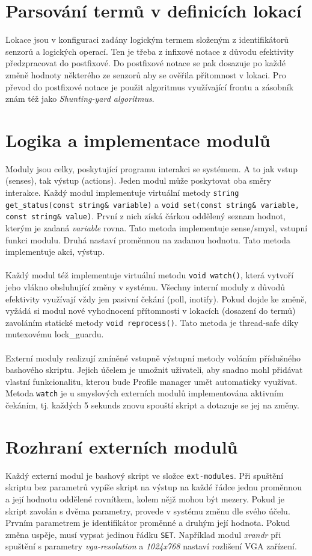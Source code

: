 \documentclass[10pt,a4paper]{article}
\begin{document}
\section*{Parsování termů v definicích lokací}
Lokace jsou v konfiguraci zadány logickým termem složeným z identifikátorů senzorů a logických operací. Ten je třeba z infixové notace z důvodu efektivity předzpracovat do postfixové. Do postfixové notace se pak dosazuje po každé změně hodnoty některého ze senzorů aby se ověřila přítomnost v lokaci. Pro převod do postfixové notace je použit algoritmus využívající frontu a zásobník znám též jako {\it Shunting-yard algoritmus}. \\

\section*{Logika a implementace modulů}
Moduly jsou celky, poskytující programu interakci se systémem. A to jak vstup (senses), tak výstup (actions). Jeden modul může poskytovat oba směry interakce. Každý modul implementuje virtuální metody \texttt{string get\_status(const string\& variable)} a \texttt{void set(const string\& variable, const string\& value)}. První z nich získá čárkou oddělený seznam hodnot, kterým je zadaná {\it variable} rovna. Tato metoda implementuje sense/smysl, vstupní funkci modulu. Druhá nastaví proměnnou na zadanou hodnotu. Tato metoda implementuje akci, výstup. \\
\\
Každý modul též implementuje virtuální metodu \texttt{void watch()}, která vytvoří jeho vlákno obsluhující změny v systému. Všechny interní moduly z důvodů efektivity využívají vždy jen pasivní čekání (poll, inotify). Pokud dojde ke změně, vyžádá si modul nové vyhodnocení přítomnosti v lokacích (dosazení do termů) zavoláním statické metody \texttt{void reprocess()}. Tato metoda je thread-safe díky mutexovému lock\_guardu. \\
\\
Externí moduly realizují zmíněné vstupně výstupní metody voláním příslušného bashového skriptu. Jejich účelem je umožnit uživateli, aby snadno mohl přidávat vlastní funkcionalitu, kterou bude Profile manager umět automaticky využívat. Metoda \texttt{watch} je u smyslových externích modulů implementována aktivním čekáním, tj. každých 5 sekunds znovu spouští skript a dotazuje se jej na změny. \\

\section*{Rozhraní externích modulů}
Každý externí modul je bashový skript ve složce \texttt{ext-modules}. Při spuštění skriptu bez parametrů vypíše skript na výstup na každé řádce jednu proměnnou a její hodnotu oddělené rovnítkem, kolem nějž mohou být mezery. Pokud je skript zavolán s dvěma parametry, provede v systému změnu dle svého účelu. Prvním parametrem je identifikátor proměnné a druhým její hodnota. Pokud změna uspěje, musí vypsat jedinou řádku \texttt{SET}. Například modul {\it xrandr} při spuštění s parametry {\it vga-resolution} a {\it 1024x768} nastaví rozlišení VGA zařízení. \\
\end{document}

